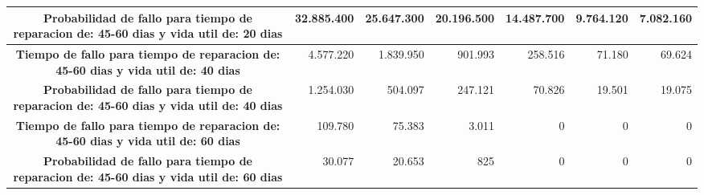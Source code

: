 \begin{table}[h]
{\begin{tabular}{|c|rrrrrr|}
\textbf{Probabilidad de fallo para tiempo de reparacion de: 45-60 dias y vida util de: 20 dias} & 32.885.400  & 25.647.300 & 20.196.500 & 14.487.700 & 9.764.120  & 7.082.160  \\ \hline
\textbf{Tiempo de fallo para tiempo de reparacion de: 45-60 dias y vida util de: 40 dias}       & 4.577.220   & 1.839.950  & 901.993    & 258.516    & 71.180     & 69.624     \\ \hline
\textbf{Probabilidad de fallo para tiempo de reparacion de: 45-60 dias y vida util de: 40 dias} & 1.254.030   & 504.097    & 247.121    & 70.826     & 19.501     & 19.075     \\ \hline
\textbf{Tiempo de fallo para tiempo de reparacion de: 45-60 dias y vida util de: 60 dias}       & 109.780     & 75.383     & 3.011      & 0          & 0          & 0          \\ \hline
\textbf{Probabilidad de fallo para tiempo de reparacion de: 45-60 dias y vida util de: 60 dias} & 30.077      & 20.653     & 825        & 0          & 0          & 0          \\ \hline
\end{tabular}%
}
\end{table}

